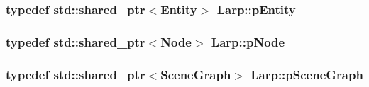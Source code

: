 \subsubsection[{\texorpdfstring{p\+Entity}{pEntity}}]{\setlength{\rightskip}{0pt plus 5cm}typedef std\+::shared\+\_\+ptr$<${\bf Entity}$>$ {\bf Larp\+::p\+Entity}}\hypertarget{namespaceLarp_aca47662468377e5aaf9a665699a4d97f}{}\label{namespaceLarp_aca47662468377e5aaf9a665699a4d97f}
\subsubsection[{\texorpdfstring{p\+Node}{pNode}}]{\setlength{\rightskip}{0pt plus 5cm}typedef std\+::shared\+\_\+ptr$<${\bf Node}$>$ {\bf Larp\+::p\+Node}}\hypertarget{namespaceLarp_a57e9a3e29e68cdf508c964274d9ac1a4}{}\label{namespaceLarp_a57e9a3e29e68cdf508c964274d9ac1a4}
\subsubsection[{\texorpdfstring{p\+Scene\+Graph}{pSceneGraph}}]{\setlength{\rightskip}{0pt plus 5cm}typedef std\+::shared\+\_\+ptr$<${\bf Scene\+Graph}$>$ {\bf Larp\+::p\+Scene\+Graph}}\hypertarget{namespaceLarp_a590f73362521ab6a9c682d4eb2719002}{}\label{namespaceLarp_a590f73362521ab6a9c682d4eb2719002}
